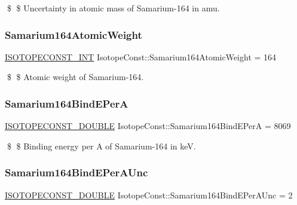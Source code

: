 \$ \$ Uncertainty in atomic mass of Samarium-\/164 in amu. \mbox{\label{group___isotope_const-_samarium-_sm164_gacd039961854b702bf13911307d5335dd}} 
\subsubsection{\texorpdfstring{Samarium164\+Atomic\+Weight}{Samarium164AtomicWeight}}
{\footnotesize\ttfamily \mbox{\hyperlink{group___isotope_const-_macros_ga5f18360b3e99483a35c32d789e62621c}{I\+S\+O\+T\+O\+P\+E\+C\+O\+N\+S\+T\+\_\+\+I\+NT}} Isotope\+Const\+::\+Samarium164\+Atomic\+Weight = 164}

\$ \$ Atomic weight of Samarium-\/164. \mbox{\label{group___isotope_const-_samarium-_sm164_gab9d6d6211277f1d0fbb071228928171a}} 
\subsubsection{\texorpdfstring{Samarium164\+Bind\+E\+PerA}{Samarium164BindEPerA}}
{\footnotesize\ttfamily \mbox{\hyperlink{group___isotope_const-_macros_ga8f45a7272ce02c0b4c65c44636ed719a}{I\+S\+O\+T\+O\+P\+E\+C\+O\+N\+S\+T\+\_\+\+D\+O\+U\+B\+LE}} Isotope\+Const\+::\+Samarium164\+Bind\+E\+PerA = 8069}

\$ \$ Binding energy per A of Samarium-\/164 in keV. \mbox{\label{group___isotope_const-_samarium-_sm164_gae66bed5e422be94b5c05d17460d96b6c}} 
\subsubsection{\texorpdfstring{Samarium164\+Bind\+E\+Per\+A\+Unc}{Samarium164BindEPerAUnc}}
{\footnotesize\ttfamily \mbox{\hyperlink{group___isotope_const-_macros_ga8f45a7272ce02c0b4c65c44636ed719a}{I\+S\+O\+T\+O\+P\+E\+C\+O\+N\+S\+T\+\_\+\+D\+O\+U\+B\+LE}} Isotope\+Const\+::\+Samarium164\+Bind\+E\+Per\+A\+Unc = 2}

